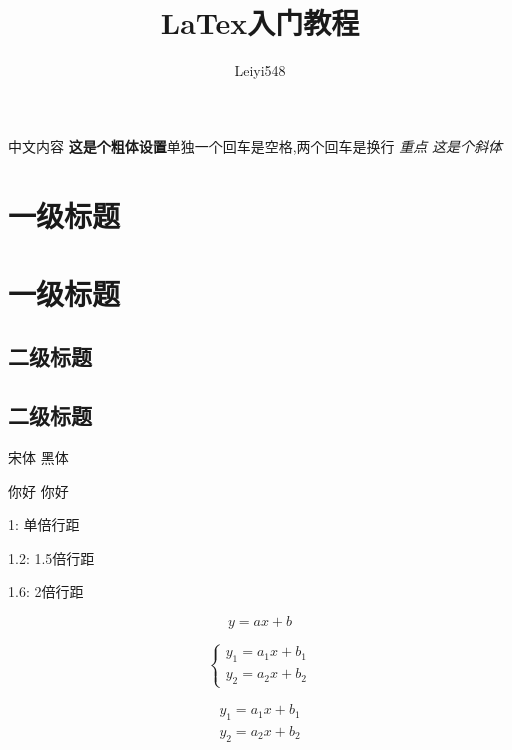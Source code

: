 \documentclass[UTF8,a4paper,12pt]{ctexart}
\title{LaTex入门教程}
\author{Leiyi548}
\date{} %
\begin{document}
\maketitle
中文内容
\textbf{这是个粗体设置}单独一个回车是空格,两个回车是换行
\emph{重点}
\textit{这是个斜体}
\section{一级标题} %
\section*{一级标题} %
\subsection{二级标题} %
\subsection*{二级标题} %

{\songti 宋体} %
{\heiti 黑体} %

{ 你好} %
{ 你好} %


1: 单倍行距

1.2: 1.5倍行距 

1.6: 2倍行距

\pagestyle{fancy}
\fancyhf{}
\cfoot{\thepage} %


\begin{equation}
    y = ax+b
\end{equation}

\begin{equation}
   \begin{cases}  %
        y_1 = a_1x + b_1\\%
        y_2 = a_2x + b_2
   \end{cases}
\end{equation}

\begin{equation}
    \begin{gathered}
        y_1 = a_1x + b_1\\
        y_2 = a_2x + b_2
    \end{gathered}
\end{equation}
\end{document}
